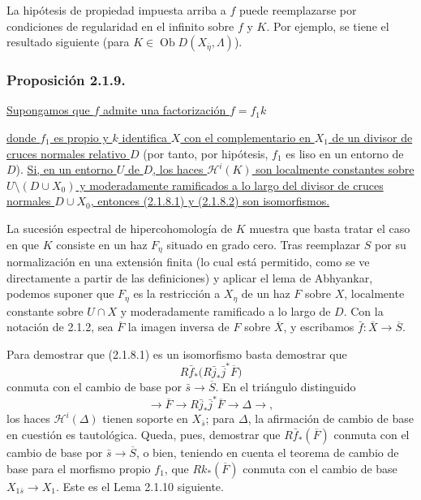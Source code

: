 \pageoriginale

La hipótesis de propiedad impuesta arriba a $f$ puede reemplazarse por
condiciones de regularidad en el infinito sobre $f$ y $K$. Por ejemplo, se
tiene el resultado siguiente (para
$K\in\operatorname{Ob}D(X_{\bar\eta},\Lambda)$).

\subsubsection*{Proposición 2.1.9.}
\underline{Supongamos que $f$ admite una factorización $f=f_1k$}
\begin{center}
\end{center}
\underline{donde $f_1$ es propio y $k$ identifica $X$ con el complementario
en $X_1$ de un divisor de cruces normales relativo $D$} (por tanto, por
hipótesis, $f_1$ es liso en un entorno de $D$). \underline{Si, en un entorno
$U$ de $D$, los haces $\mathcal H^i(K)$ son localmente constantes sobre
$U\setminus(D\cup X_0)$ y moderadamente ramificados a lo largo del divisor de
cruces normales $D\cup X_0$, entonces (2.1.8.1) y (2.1.8.2) son
isomorfismos.}

La sucesión espectral de hipercohomología de $K$ muestra que basta tratar el
caso en que $K$ consiste en un haz $F_\eta$ situado en grado cero. Tras
reemplazar $S$ por su normalización en una extensión finita (lo cual está
permitido, como se ve directamente a partir de las definiciones) y aplicar el
lema de Abhyankar, podemos suponer que $F_\eta$ es la restricción a $X_\eta$
de un haz $F$ sobre $X$, localmente constante sobre $U\cap X$ y moderadamente
ramificado a lo largo de $D$. Con la notación de 2.1.2, sea $\overline F$ la
imagen inversa de $F$ sobre $\overline X$, y escribamos
$\bar f:\overline X\longrightarrow\overline S$.

Para demostrar que (2.1.8.1) es un isomorfismo basta demostrar que
\[
R\bar f_*\bigl(R\bar j_*\bar j^*\overline F\bigr)
\]
conmuta con el cambio de base por $\bar s\longrightarrow\overline S$. En el
triángulo distinguido
\[
\longrightarrow\overline F\longrightarrow
R\bar j_*\bar j^*\overline F\longrightarrow\Delta\longrightarrow,
\]
los haces $\mathcal H^i(\Delta)$ tienen soporte en $X_{\bar s}$; para
$\Delta$, la afirmación de cambio de base en cuestión es tautológica. Queda,
pues, demostrar que $R\bar f_*(\overline F)$ conmuta con el cambio de base por
$\bar s\longrightarrow\overline S$, o bien, teniendo en cuenta el teorema de
cambio de base para el morfismo propio $f_1$, que $Rk_*(\overline F)$ conmuta
con el cambio de base $X_{1\bar s}\longrightarrow X_1$. Este es el Lema
2.1.10 siguiente.

